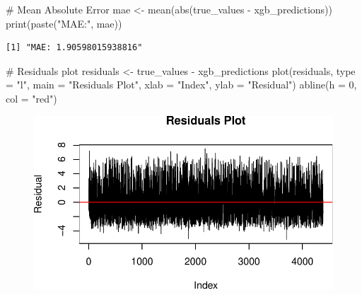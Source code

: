 \documentclass[
  super,
  preprint,
  3p]{elsarticle}
\newenvironment{Shaded}{\begin{snugshade}}{\end{snugshade}}
\newcommand{\AttributeTok}[1]{\textcolor[rgb]{0.40,0.45,0.13}{#1}}
\newcommand{\CommentTok}[1]{\textcolor[rgb]{0.37,0.37,0.37}{#1}}
\newcommand{\DecValTok}[1]{\textcolor[rgb]{0.68,0.00,0.00}{#1}}
\newcommand{\FunctionTok}[1]{\textcolor[rgb]{0.28,0.35,0.67}{#1}}
\newcommand{\NormalTok}[1]{\textcolor[rgb]{0.00,0.23,0.31}{#1}}
\newcommand{\OtherTok}[1]{\textcolor[rgb]{0.00,0.23,0.31}{#1}}
\newcommand{\SpecialCharTok}[1]{\textcolor[rgb]{0.37,0.37,0.37}{#1}}
\newcommand{\StringTok}[1]{\textcolor[rgb]{0.13,0.47,0.30}{#1}}
\begin{document}
\begin{Shaded}
\begin{Highlighting}[]
\CommentTok{\# Mean Absolute Error}
\NormalTok{mae }\OtherTok{\textless{}{-}} \FunctionTok{mean}\NormalTok{(}\FunctionTok{abs}\NormalTok{(true\_values }\SpecialCharTok{{-}}\NormalTok{ xgb\_predictions))}
\FunctionTok{print}\NormalTok{(}\FunctionTok{paste}\NormalTok{(}\StringTok{"MAE:"}\NormalTok{, mae))}
\end{Highlighting}
\end{Shaded}

\begin{verbatim}
[1] "MAE: 1.90598015938816"
\end{verbatim}

\begin{Shaded}
\begin{Highlighting}[]
\CommentTok{\# Residuals plot}
\NormalTok{residuals }\OtherTok{\textless{}{-}}\NormalTok{ true\_values }\SpecialCharTok{{-}}\NormalTok{ xgb\_predictions}
\FunctionTok{plot}\NormalTok{(residuals, }\AttributeTok{type =} \StringTok{"l"}\NormalTok{, }\AttributeTok{main =} \StringTok{"Residuals Plot"}\NormalTok{, }\AttributeTok{xlab =} \StringTok{"Index"}\NormalTok{, }\AttributeTok{ylab =} \StringTok{"Residual"}\NormalTok{)}
\FunctionTok{abline}\NormalTok{(}\AttributeTok{h =} \DecValTok{0}\NormalTok{, }\AttributeTok{col =} \StringTok{"red"}\NormalTok{)}
\end{Highlighting}
\end{Shaded}

\begin{figure}[H]

{\centering \includegraphics{project_report_files/figure-pdf/unnamed-chunk-16-1.pdf}

}

\end{figure}
\end{document}
